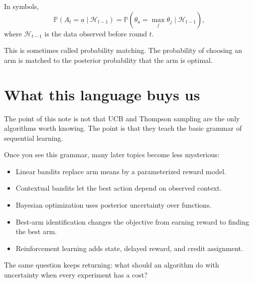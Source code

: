 \documentclass[en,nofont,11pt]{elegantbook}
\newcommand{\Prob}{\mathbb{P}}
\begin{document}
In symbols,
\[
\Prob(A_t=a\mid \mathcal{H}_{t-1})
=
\Prob\left(
\theta_a=\max_j\theta_j
\mid \mathcal{H}_{t-1}
\right),
\]
where $\mathcal{H}_{t-1}$ is the data observed before round $t$.

This is sometimes called probability matching.  The probability of choosing an arm is matched to the posterior probability that the arm is optimal.

\chapter{What this language buys us}

The point of this note is not that UCB and Thompson sampling are the only algorithms worth knowing.  The point is that they teach the basic grammar of sequential learning.

\begin{center}
\end{center}

Once you see this grammar, many later topics become less mysterious:

\begin{itemize}
\item Linear bandits replace arm means by a parameterized reward model.
\item Contextual bandits let the best action depend on observed context.
\item Bayesian optimization uses posterior uncertainty over functions.
\item Best-arm identification changes the objective from earning reward to finding the best arm.
\item Reinforcement learning adds state, delayed reward, and credit assignment.
\end{itemize}

The same question keeps returning: what should an algorithm do with uncertainty when every experiment has a cost?
\end{document}
